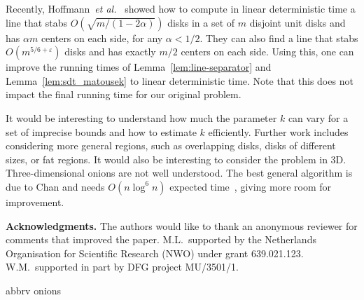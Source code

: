 \documentclass{paper}
\newcommand {\eps} {\varepsilon}
\newcommand {\etal} {\textit {et al.}}
\begin{document}
Recently, Hoffmann~\etal~\cite{hkm13} showed how to compute 
in linear deterministic time a line that stabs 
$O(\sqrt{m/(1-2\alpha)})$ disks in a set of $m$ disjoint unit 
disks and has $\alpha m$ centers on each side, for any 
$\alpha < 1/2$. They can also find a line that stabs $O(m^{5/6+\eps})$ 
disks and has exactly $m/2$ centers on each side. 
Using this, one can improve the running times of 
Lemma~\ref{lem:line-separator} and Lemma~\ref{lem:sdt_matousek} 
to linear deterministic time. Note that this does not 
impact the final running time for our original problem.

It would be interesting to understand how much the parameter
$k$ can vary for a set of imprecise bounds and how
to estimate $k$ efficiently.
Further work includes considering more
general regions, such as overlapping disks, disks of
different sizes, or fat
regions. It would also be interesting to consider the
problem in 3D. Three-dimensional onions are not
well understood. The best general algorithm is due to Chan
and needs $O (n \log^{6} n)$ expected time~\cite{c-addsf3cha2nnq-10}, 
giving more room for improvement.

\noindent\textbf{Acknowledgments.}
The authors would like to thank an anonymous reviewer for comments that improved the paper.
M.L.~supported by the Netherlands Organisation for Scientific 
Research (NWO) under grant 639.021.123.  W.M.~supported in part 
by DFG project MU/3501/1.


 {abbrv}
 {onions}
\end{document}
